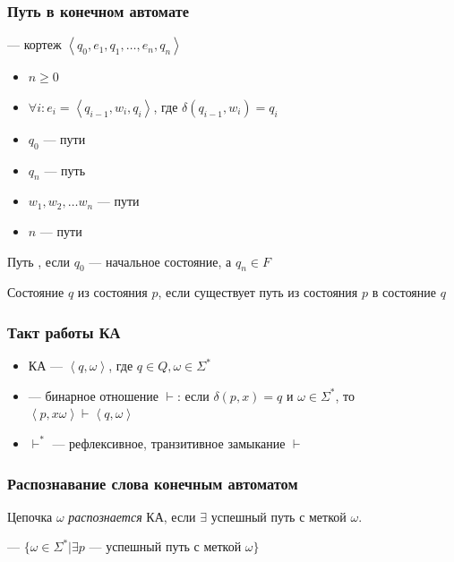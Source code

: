 \documentclass[a4paper, 14pt]{extarticle}
\begin{document}
\subsubsection{Путь в конечном автомате}
 --- кортеж $ \left\langle q_0, e_1, q_1, \ldots, e_n, q_n \right\rangle$
\begin{itemize}
    \item $n \ge 0$
    \item $\forall i: e_i = \left\langle q_{i-1}, w_i, q_i \right\rangle$, где $ \delta(q_{i-1}, w_i) = q_i $
    \item $q_0$ ---  пути
    \item $q_n$ ---  путь
    \item $w_1, w_2, \ldots w_n$ ---  пути
    \item $n$ ---  пути 
\end{itemize}


Путь , если $q_0$ --- начальное состояние, а $q_n \in F$ 

Состояние $q$  из состояния $p$, если существует путь из состояния $p$ в состояние $q$

\subsubsection*{Такт работы КА}
\begin{itemize}
    \item {} КА --- $ \left\langle q, \omega \right\rangle$, где $q \in Q, \omega \in \Sigma^* $
    \item {} --- бинарное отношение $\vdash$: если $ \delta(p, x) = q $ и $ \omega \in \Sigma^* $, то $ \left\langle p, x \omega \right\rangle \vdash \left\langle q, \omega \right\rangle $
    \item $\vdash^*$ --- рефлексивное, транзитивное замыкание $\vdash$
\end{itemize}

\subsubsection{Распознавание слова конечным автоматом}

Цепочка $\omega$ \textit{распознается} КА, если $\exists$ успешный путь с меткой $ \omega $. 

 --- $ \{ \omega \in \Sigma^* | \exists p \text{ --- успешный путь с меткой } \omega  \} $
\end{document}
